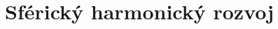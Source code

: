 \documentclass[a4paper,12pt]{book}
\newcommand{\diff}{\mathrm d}
\begin{document}
%
%
%
%
%







\chapter{Sférický harmonický rozvoj}
\label{sec:spherical_harmonic_expansion}
\end{document}

